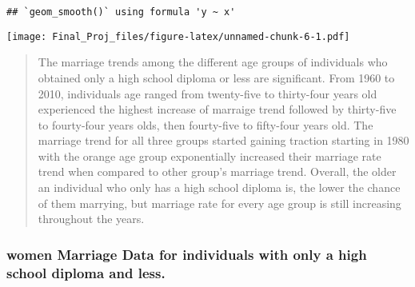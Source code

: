 \documentclass[
]{article}
\begin{document}
\begin{verbatim}
## `geom_smooth()` using formula 'y ~ x'
\end{verbatim}

\texttt{[image: Final\_Proj\_files/figure-latex/unnamed-chunk-6-1.pdf]}

\begin{quote}
The marriage trends among the different age groups of individuals who
obtained only a high school diploma or less are significant. From 1960
to 2010, individuals age ranged from twenty-five to thirty-four years
old experienced the highest increase of marraige trend followed by
thirty-five to fourty-four years olds, then fourty-five to fifty-four
years old. The marriage trend for all three groups started gaining
traction starting in 1980 with the orange age group exponentially
increased their marriage rate trend when compared to other group's
marriage trend. Overall, the older an individual who only has a high
school diploma is, the lower the chance of them marrying, but marriage
rate for every age group is still increasing throughout the years.
\end{quote}

\hypertarget{women-marriage-data-for-individuals-with-only-a-high-school-diploma-and-less.}{%
\subsubsection{women Marriage Data for individuals with only a high
school diploma and
less.}\label{women-marriage-data-for-individuals-with-only-a-high-school-diploma-and-less.}}
\end{document}
